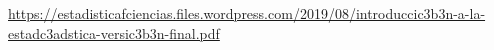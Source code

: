 \begin{thebibliography}{X}




 \url{https://estadisticafciencias.files.wordpress.com/2019/08/introduccic3b3n-a-la-estadc3adstica-versic3b3n-final.pdf} \label{MargaritaJaimeRuthLizbeth}


















\end{thebibliography}

